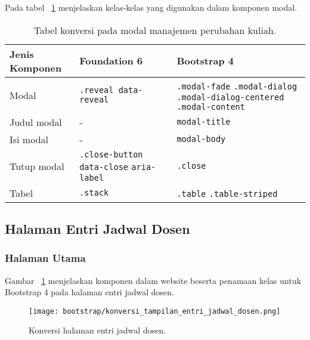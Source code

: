 \noindent Pada tabel ~\ref{table:konversiModalManajemenPerubahanKuliah} menjelaskan kelas-kelas yang digunakan dalam komponen modal.
\begin{table}[H]
	\caption{Tabel konversi pada modal manajemen perubahan kuliah.}
	\begin{tabular}{| p{} | p{} | p{} |} 
		\hline
		\textbf{Jenis Komponen} & \textbf{Foundation 6} & \textbf{Bootstrap 4}  \\ [0.5ex] 
		\hline	
		Modal & \texttt{.reveal data-reveal} & \texttt{.modal-fade} \newline \texttt{.modal-dialog} \newline \texttt{.modal-dialog-centered} \newline \texttt{.modal-content} \\
		\hline
		Judul modal & - & \texttt{modal-title}\\
		\hline
		Isi modal & - & \texttt{modal-body}\\
		\hline
		Tutup modal & \texttt{.close-button} \newline \texttt{data-close} \newline \texttt{aria-label} & \texttt{.close}\\
		\hline	
		Tabel & \texttt{.stack} & \texttt{.table} \newline \texttt{.table-striped} \\[1ex]
		\hline
	\end{tabular}
	\label{table:konversiModalManajemenPerubahanKuliah}
\end{table}

\subsection{Halaman Entri Jadwal Dosen}
\subsubsection{Halaman Utama}
\noindent Gambar ~\ref{fig:konversiEntriJadwalDosen} menjelaskan komponen dalam website beserta penamaan kelas untuk Bootstrap 4 pada halaman entri jadwal dosen.\\
\begin{figure} [H]
	\centering  
	\texttt{[image: bootstrap/konversi\_tampilan\_entri\_jadwal\_dosen.png]}
	\caption{Konversi halaman entri jadwal dosen.}
	\label{fig:konversiEntriJadwalDosen}
\end{figure}

